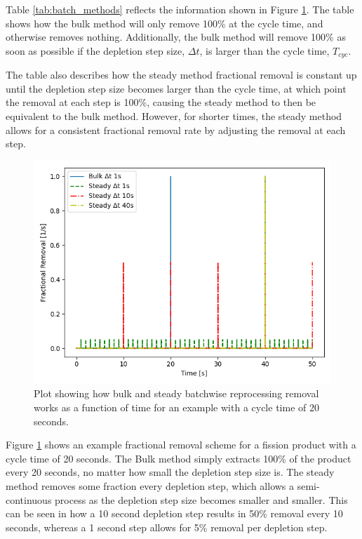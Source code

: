 Table \ref{tab:batch_methods} reflects the information shown in Figure \ref{fig:bulk_repr_cnst}. The table shows how the bulk method will only remove 100\% at the cycle time, and otherwise removes nothing. Additionally, the bulk method will remove 100\% as soon as possible if the depletion step size, $\Delta t$, is larger than the cycle time, $T_{cyc}$.

The table also describes how the steady method fractional removal is constant up until the depletion step size becomes larger than the cycle time, at which point the removal at each step is 100\%, causing the steady method to then be equivalent to the bulk method. However, for shorter times, the steady method allows for a consistent fractional removal rate by adjusting the removal at each step.


\begin{figure}[H]
  \centering
  \includegraphics[scale=0.75]{images/bulk-compare-cycles.png}
  \caption{Plot showing how bulk and steady batchwise reprocessing removal works as a function of time for an example with a cycle time of 20 seconds.}
   \label{fig:bulk_repr_cnst}
\end{figure}

Figure \ref{fig:bulk_repr_cnst} shows an example fractional removal scheme for a fission product with a cycle time of 20 seconds. The Bulk method simply extracts 100\% of the product every 20 seconds, no matter how small the depletion step size is. The steady method removes some fraction every depletion step, which allows a semi-continuous process as the depletion step size becomes smaller and smaller. This can be seen in how a 10 second depletion step results in 50\% removal every 10 seconds, whereas a 1 second step allows for 5\% removal per depletion step.


